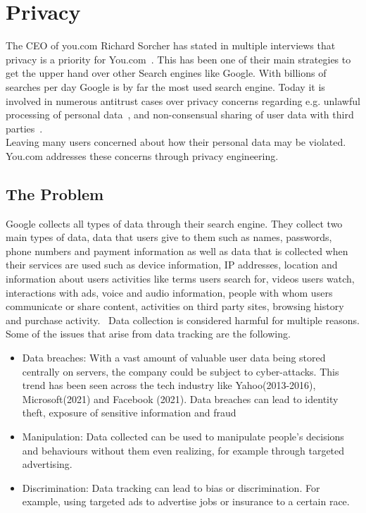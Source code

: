 \documentclass[5p,twocolumn,final]{elsarticle}
\begin{document}
\section{Privacy}
The CEO of you.com Richard Sorcher has stated in multiple interviews that privacy is a priority for You.com~\cite{sorcher2022}. This has been one of their main strategies to get the upper hand over other Search engines like Google. With billions of searches per day Google is by far the most used search engine. Today it is involved in numerous antitrust cases over privacy concerns regarding e.g. unlawful processing of personal data~\cite{council_of_state}, and non-consensual sharing of user data with third parties~\cite{aepd}.\\
Leaving many users concerned about how their personal data may be violated. You.com addresses these concerns through privacy engineering.

\subsection{The Problem}
Google collects all types of data through their search engine. They collect two main types of data, data that users give to them such as names, passwords, phone numbers and payment information as well as data that is collected when their services are used such as device information, IP addresses, location and information about users activities like terms users search for, videos users watch, interactions with ads, voice and audio information, people with whom users communicate or share content, activities on third party sites, browsing history and purchase activity.~\cite{googleprivacy}
Data collection is considered harmful for multiple reasons. Some of the issues that arise from data tracking are the following.
\begin{itemize}
    
 \item{Data breaches:} With a vast amount of valuable user data being stored centrally on servers, the company could be subject to cyber-attacks. This trend has been seen across the tech industry like Yahoo(2013-2016), Microsoft(2021) and Facebook (2021). 
Data breaches can lead to identity theft, exposure of sensitive information and fraud~\cite{hammouchi2019}
\item{Manipulation:} Data collected can be used to manipulate people's decisions and behaviours without them even realizing, for example through targeted advertising.~\cite{thomas2018}
\item{Discrimination:} Data tracking can lead to bias or discrimination. For example, using targeted ads to advertise jobs or insurance to a certain race.
\end{itemize}
\end{document}
